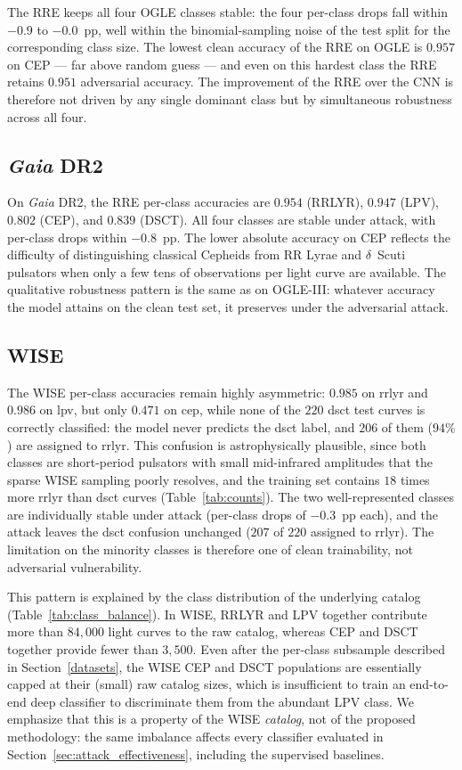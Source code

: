 \documentclass{aa}
\begin{document}
The RRE keeps all four OGLE classes stable: the four per-class drops
fall within $-0.9$ to $-0.0$~pp, well within the binomial-sampling noise of
the test split for the corresponding class size. The lowest clean accuracy
of the RRE on OGLE is $0.957$ on CEP --- far above
random guess --- and even on this hardest class the RRE retains $0.951$
adversarial accuracy. The improvement of the RRE over the CNN is
therefore not driven by any single dominant class but by simultaneous
robustness across all four.

\subsection{\textit{Gaia} DR2}

On \textit{Gaia} DR2, the RRE per-class accuracies are $0.954$ (RRLYR),
$0.947$ (LPV), $0.802$ (CEP), and $0.839$ (DSCT). All four classes are
stable under attack, with per-class drops within $-0.8$~pp. The lower
absolute accuracy on CEP reflects the
difficulty of distinguishing classical Cepheids from RR Lyrae and
$\delta$~Scuti pulsators when only a few tens of observations per light
curve are available. The qualitative robustness pattern is the same as on
OGLE-III: whatever accuracy the model attains on the clean test set, it
preserves under the adversarial attack.

\subsection{WISE}

The WISE per-class accuracies remain highly asymmetric: $0.985$ on rrlyr
and $0.986$ on lpv, but only $0.471$ on cep, while none of the $220$ dsct
test curves is correctly classified: the model never predicts the dsct
label, and $206$ of them ($94\%$) are assigned to rrlyr. This confusion is
astrophysically plausible, since both classes are short-period pulsators
with small mid-infrared amplitudes that the sparse WISE sampling poorly
resolves, and the training set contains $18$ times more rrlyr than dsct
curves (Table~\ref{tab:counts}). The two well-represented classes are
individually stable under attack (per-class drops of $-0.3$~pp each), and
the attack leaves the dsct confusion unchanged ($207$ of $220$ assigned to
rrlyr). The limitation on the minority classes is therefore one of clean
trainability, not adversarial vulnerability.

This pattern is explained by the class distribution of the underlying
catalog (Table~\ref{tab:class_balance}). In WISE, RRLYR and
LPV together contribute more than $84{,}000$ light curves to the
raw catalog, whereas CEP and DSCT together provide fewer
than $3{,}500$. Even after the per-class subsample described in
Section~\ref{datasets}, the WISE CEP and DSCT populations are essentially
capped at their (small) raw catalog sizes, which is insufficient to train
an end-to-end deep classifier to discriminate them from the abundant
LPV class. We emphasize that this is a property of the WISE
\emph{catalog}, not of the proposed methodology: the same imbalance
affects every classifier evaluated in
Section~\ref{sec:attack_effectiveness}, including the supervised
baselines.
\end{document}
